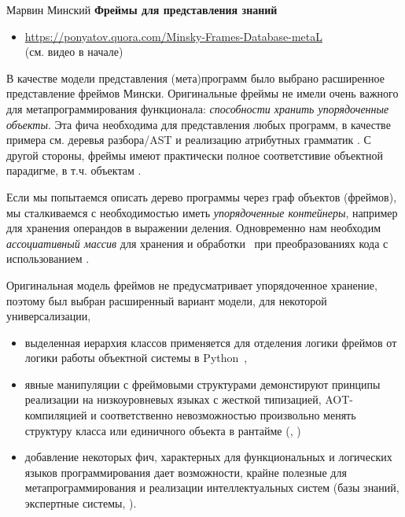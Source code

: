 \label{frame}\secdown

\clearpage
\cite{minsky} Марвин Минский \textbf{Фреймы для представления знаний}

\begin{itemize}
  \item 
\url{https://ponyatov.quora.com/Minsky-Frames-Database-metaL}\\(см. видео в
начале)
\end{itemize}

В качестве модели представления (мета)программ было выбрано расширенное
представление фреймов Мински. Оригинальные фреймы не имели очень важного для
метапрограммирования функционала: \textit{способности хранить упорядоченные
объекты}. Эта фича необходима для представления любых
программ, в качестве примера см. деревья разбора/AST и реализацию атрибутных
грамматик \cite{dragon2}. С другой стороны, фреймы имеют практически полное
соответстивие объектной парадигме, в т.ч. объектам \py.

Если мы попытаемся описать дерево программы через граф объектов (фреймов), мы
сталкиваемся с необходимостью иметь \emph{упорядоченные контейнеры}, например
для хранения операндов в выражении деления. Одновременно нам необходим
\emph{ассоциативный массив} для хранения и обработки \ при
преобразованиях кода с использованием .

Оригинальная модель фреймов не предусматривает упорядоченное хранение, поэтому
был выбран расширенный вариант модели, для некоторой универсализации,
\begin{itemize}
  \item 
выделенная иерархия классов применяется для отделения логики фреймов от логики
работы объектной системы в Python\ ,
  \item 
явные манипуляции с фреймовыми структурами демонстируют принципы реализации на
низкоуровневых языках с жесткой типизацией, AOT-компиляцией и соответственно
невозможностью произвольно менять структуру класса или единичного объекта в
рантайме (\cpp, \java)
  \item 
добавление некоторых фич, характерных для функциональных и логических языков 
программирования 
дает возможности, крайне полезные для метапрограммирования и реализации
интеллектуальных систем (базы знаний, экспертные системы, ).
\end{itemize}

